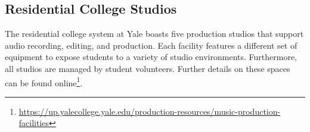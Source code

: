 \subsection{Residential College Studios}

The residential college system at Yale boasts five production studios that support audio recording, editing, and production. Each facility features a different set of equipment to expose students to a variety of studio environments. Furthermore, all studios are managed by student volunteers. Further details on these spaces can be found online\footnote{\url{https://up.yalecollege.yale.edu/production-resources/music-production-facilities}}.

